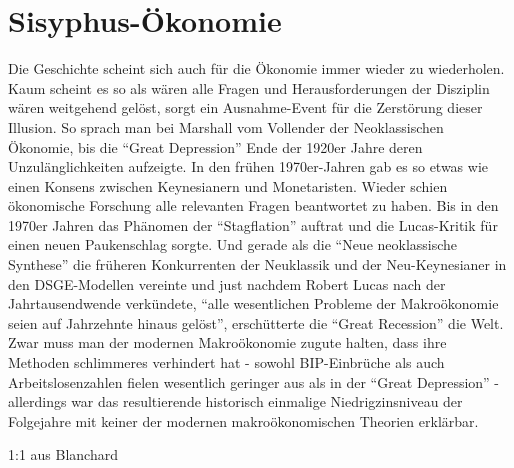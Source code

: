 %
%
%

\chapter{Sisyphus-Ökonomie}

Die Geschichte scheint sich auch für die Ökonomie immer wieder zu wiederholen. Kaum scheint es so als wären alle Fragen und Herausforderungen der Disziplin wären weitgehend gelöst, sorgt ein Ausnahme-Event für die Zerstörung dieser Illusion. So sprach man bei Marshall vom Vollender der Neoklassischen Ökonomie, bis die "`Great Depression"' Ende der 1920er Jahre deren Unzulänglichkeiten aufzeigte. In den frühen 1970er-Jahren gab es so etwas wie einen Konsens zwischen Keynesianern und Monetaristen. Wieder schien ökonomische Forschung alle relevanten Fragen beantwortet zu haben. Bis in den 1970er Jahren das Phänomen der "`Stagflation"' auftrat und die Lucas-Kritik für einen neuen Paukenschlag sorgte. Und gerade als die "`Neue neoklassische Synthese"' die früheren Konkurrenten der Neuklassik und der Neu-Keynesianer in den DSGE-Modellen vereinte und just nachdem Robert Lucas nach der Jahrtausendwende verkündete, "`alle wesentlichen Probleme der Makroökonomie seien auf Jahrzehnte hinaus gelöst"', erschütterte die "`Great Recession"' die Welt. Zwar muss man der modernen Makroökonomie zugute halten, dass ihre Methoden schlimmeres verhindert hat - sowohl BIP-Einbrüche als auch Arbeitslosenzahlen fielen wesentlich geringer aus als in der "`Great Depression"' - allerdings war das resultierende historisch einmalige Niedrigzinsniveau der Folgejahre mit keiner der modernen makroökonomischen Theorien erklärbar.


1:1 aus Blanchard

